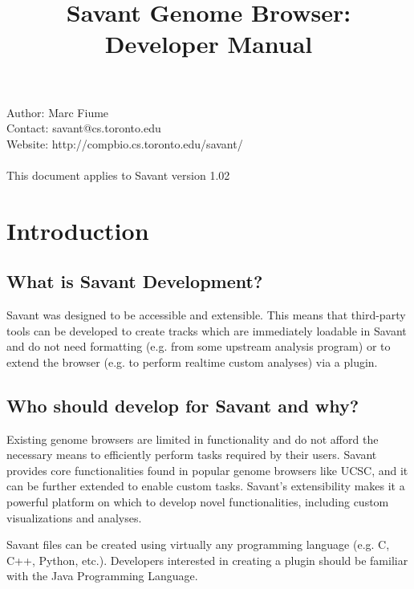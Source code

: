 \documentclass{report}
\begin{document}
\title{Savant Genome Browser: Developer Manual}
\maketitle

\setlength{\parindent}{0pt} 
\setlength{\parskip}{2ex}

Author: Marc Fiume \\
Contact: savant@cs.toronto.edu \\
Website: http://compbio.cs.toronto.edu/savant/ \\
\\
This document applies to Savant version 1.02\\

\newpage

\tableofcontents

\newpage

\chapter{Introduction}

\section{What is Savant Development?}

Savant was designed to be accessible and extensible. This means that third-party tools can be developed to create tracks which are immediately loadable in Savant and do not need formatting (e.g. from some upstream analysis program) or to extend the browser (e.g. to perform realtime custom analyses) via a plugin.

\section{Who should develop for Savant and why?}

Existing genome browsers are limited in functionality and do not afford the necessary means to efficiently perform tasks required by their users. Savant provides core functionalities found in popular genome browsers like UCSC, and it can be further extended to enable custom tasks. Savant's extensibility makes it a powerful platform on which to develop novel functionalities, including custom visualizations and analyses.

Savant files can be created using virtually any programming language (e.g. C, C++, Python, etc.). Developers interested in creating a plugin should be familiar with the Java Programming Language. 
\end{document}
